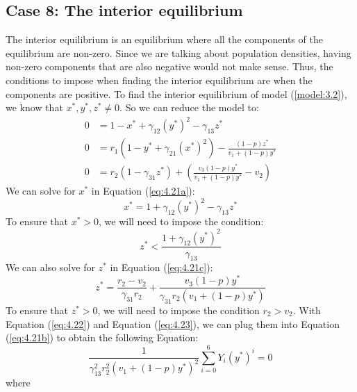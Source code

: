 \subsection{Case 8: The interior equilibrium}\label{subsec:interior_equilibrium}
The interior equilibrium is an equilibrium where all the components of the equilibrium are non-zero. Since we are talking about population densities, having non-zero components that are also negative would not make sense. Thus, the conditions to impose when finding the interior equilibrium are when the components are positive. To find the interior equilibrium of model (\ref{model:3.2}), we know that $x^*,y^*,z^*\neq0$. So we can reduce the model to:
\begin{subequations}
    \begin{align}
        0 &= 1-x^*+\gamma_{12}\left(y^*\right)^2-\gamma_{13}z^*
        \label{eq:4.21a}\\
        0 &= r_1\left(1-y^*+\gamma_{21}\left(x^*\right)^2\right)-\frac{\left(1-p\right)z^*}{v_1+\left(1-p\right)y^*}
        \label{eq:4.21b}\\
        0 &= r_2\left(1-\gamma_{31}z^*\right)+\left(\frac{v_3\left(1-p\right)y^*}{v_1+\left(1-p\right)y^*}-v_2\right)
        \label{eq:4.21c}
    \end{align}
    \label{eq:4.21}
\end{subequations}
We can solve for $x^*$ in Equation (\ref{eq:4.21a}):
\begin{equation}
    x^*=1+\gamma_{12}\left(y^*\right)^2-\gamma_{13}z^*
    \label{eq:4.22}
\end{equation}
To ensure that $x^*>0$, we will need to impose the condition:
\[
z^*<\frac{1+\gamma_{12}\left(y^*\right)^2}{\gamma_{13}}
\]
We can also solve for $z^*$ in Equation (\ref{eq:4.21c}):
\begin{equation}
    z^*=\frac{r_2-v_2}{\gamma_{31}r_2}+\frac{v_3\left(1-p\right)y^*}{\gamma_{31}r_2\left(v_1+\left(1-p\right)y^*\right)}
    \label{eq:4.23}
\end{equation}
To ensure that $z^*>0$, we will need to impose the condition $r_2>v_2$. With Equation (\ref{eq:4.22}) and Equation (\ref{eq:4.23}), we can plug them into Equation (\ref{eq:4.21b}) to obtain the following Equation:
\begin{equation}
    \frac{1}{\gamma_{13}^2r_2^2\left(v_1+\left(1-p\right)y^*\right)^2}\sum_{i=0}^6 Y_i\left(y^*\right)^i=0
    \label{eq:4.24}
\end{equation}
where
